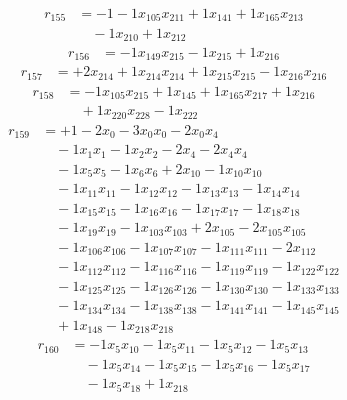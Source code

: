 \[\begin{aligned}
r_{155} &= - 1 - 1 x_{105} x_{211} + 1 x_{141} + 1 x_{165} x_{213} \\
 &\quad - 1 x_{210} + 1 x_{212}
\end{aligned}\]
\[\begin{aligned}
r_{156} &= - 1 x_{149} x_{215} - 1 x_{215} + 1 x_{216}
\end{aligned}\]
\[\begin{aligned}
r_{157} &= + 2 x_{214} + 1 x_{214} x_{214} + 1 x_{215} x_{215} - 1 x_{216} x_{216}
\end{aligned}\]
\[\begin{aligned}
r_{158} &= - 1 x_{105} x_{215} + 1 x_{145} + 1 x_{165} x_{217} + 1 x_{216} \\
 &\quad + 1 x_{220} x_{228} - 1 x_{222}
\end{aligned}\]
\[\begin{aligned}
r_{159} &= + 1 - 2 x_{0} - 3 x_{0} x_{0} - 2 x_{0} x_{4} \\
 &\quad - 1 x_{1} x_{1} - 1 x_{2} x_{2} - 2 x_{4} - 2 x_{4} x_{4} \\
 &\quad - 1 x_{5} x_{5} - 1 x_{6} x_{6} + 2 x_{10} - 1 x_{10} x_{10} \\
 &\quad - 1 x_{11} x_{11} - 1 x_{12} x_{12} - 1 x_{13} x_{13} - 1 x_{14} x_{14} \\
 &\quad - 1 x_{15} x_{15} - 1 x_{16} x_{16} - 1 x_{17} x_{17} - 1 x_{18} x_{18} \\
 &\quad - 1 x_{19} x_{19} - 1 x_{103} x_{103} + 2 x_{105} - 2 x_{105} x_{105} \\
 &\quad - 1 x_{106} x_{106} - 1 x_{107} x_{107} - 1 x_{111} x_{111} - 2 x_{112} \\
 &\quad - 1 x_{112} x_{112} - 1 x_{116} x_{116} - 1 x_{119} x_{119} - 1 x_{122} x_{122} \\
 &\quad - 1 x_{125} x_{125} - 1 x_{126} x_{126} - 1 x_{130} x_{130} - 1 x_{133} x_{133} \\
 &\quad - 1 x_{134} x_{134} - 1 x_{138} x_{138} - 1 x_{141} x_{141} - 1 x_{145} x_{145} \\
 &\quad + 1 x_{148} - 1 x_{218} x_{218}
\end{aligned}\]
\[\begin{aligned}
r_{160} &= - 1 x_{5} x_{10} - 1 x_{5} x_{11} - 1 x_{5} x_{12} - 1 x_{5} x_{13} \\
 &\quad - 1 x_{5} x_{14} - 1 x_{5} x_{15} - 1 x_{5} x_{16} - 1 x_{5} x_{17} \\
 &\quad - 1 x_{5} x_{18} + 1 x_{218}
\end{aligned}\]
